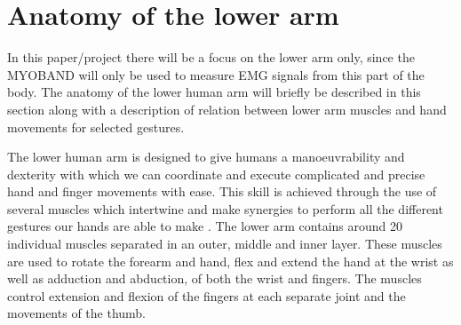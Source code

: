\section{Anatomy of the lower arm}


In this paper/project there will be a focus on the lower arm only, since the MYOBAND will only be used to measure EMG signals from this part of the body. The anatomy of the lower human arm will briefly be described in this section along with a description of relation between lower arm muscles and hand movements for selected gestures. 


The lower human arm is designed to give humans a manoeuvrability and dexterity with which we can coordinate and execute complicated and precise hand and finger movements with ease. This skill is achieved through the use of several muscles which intertwine and make synergies to perform all the different gestures our hands are able to make \cite{jiang2009} \cite{avella2006}. The lower arm contains around 20 individual muscles separated in an outer, middle and inner layer. These muscles are used to rotate the forearm and hand, flex and extend the hand at the wrist as well as adduction and abduction, of both the wrist and fingers. The muscles control extension and flexion of the fingers at each separate joint and the movements of the thumb. \cite{martini}

